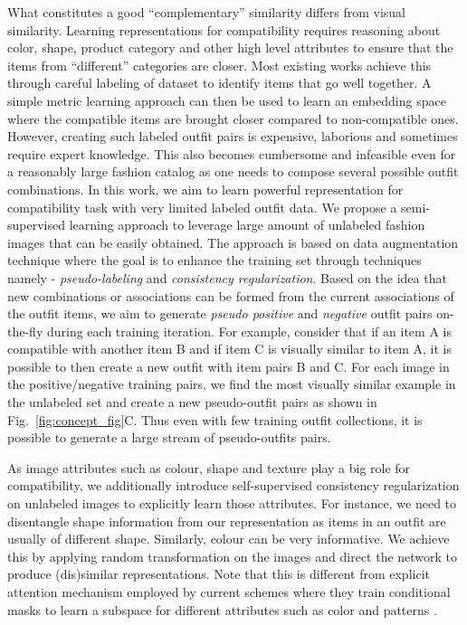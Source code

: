 \documentclass[sigconf]{acmart}
\begin{document}
What constitutes a good ``complementary'' similarity differs from visual similarity. Learning representations for compatibility requires reasoning about color, shape, product category and other high level attributes to ensure that the items from ``different'' categories are closer. Most existing works \cite{eccv2018learning, iccv2019learning,cvpr2020fashion} achieve this through careful labeling of dataset to identify items that go well together. A simple metric learning approach can then be used to learn an embedding space where the compatible items are brought closer compared to non-compatible ones. However, creating such labeled outfit pairs is expensive, laborious and sometimes require expert knowledge. This also becomes cumbersome and infeasible even for a reasonably large fashion catalog as one needs to compose several possible outfit combinations.
\vspace{1mm}
In this work, we aim to learn powerful representation for compatibility task with very limited labeled outfit data. We propose a semi-supervised learning approach to leverage large amount of unlabeled fashion images that can be easily obtained. The approach is based on data augmentation technique \cite{berthelot2019mixmatch, yun2019cutmix} where the goal is to enhance the training set through techniques namely - {\em pseudo-labeling} and {\em consistency regularization}. Based on the idea that new combinations or associations can be formed from the current associations of the outfit items, we aim to generate {\em pseudo positive} and {\em negative} outfit pairs on-the-fly during each training iteration. For example, consider that if an item A is compatible with another item B and if item C is visually similar to item A, it is possible to then create a new outfit with item pairs B and C. For each image in the positive/negative training pairs, we find the most visually similar example in the unlabeled set and create a new pseudo-outfit pairs as shown in Fig.~\ref{fig:concept_fig}{C}. Thus even with few training outfit collections, it is possible to generate a large stream of pseudo-outfits pairs.

\vspace{1mm}

As image attributes such as colour, shape and texture play a big role for compatibility, we additionally introduce self-supervised consistency regularization \cite{berthelot2019mixmatch} on unlabeled images to explicitly learn those attributes. For instance, we need to disentangle shape information from our representation as items in an outfit are usually of different shape. Similarly, colour can be very informative. We achieve this by applying random transformation on the images and direct the network to produce (dis)similar representations. Note that this is different from explicit attention mechanism employed by current schemes where they train conditional masks to learn a subspace for different attributes such as color and patterns \cite{iccv2019learning,cvpr2020fashion}. 
\vspace{1mm}
\end{document}
